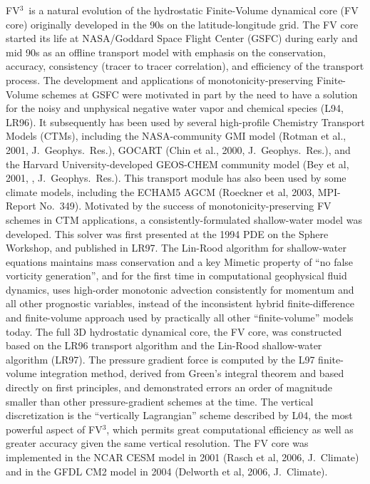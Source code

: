\documentclass[12pt,letterpaper]{book}
\newcommand{\fv}{FV$^{\mathrm{3}}$}
\begin{document}
\fv\ is a natural evolution of the hydrostatic Finite-Volume dynamical core (FV core) originally developed in the 90s on the latitude-longitude grid. The FV core started its life at NASA/Goddard Space Flight Center (GSFC) during early and mid 90s as an offline transport model with emphasis on the conservation, accuracy, consistency (tracer to tracer correlation), and efficiency of the transport process. The development and applications of monotonicity-preserving Finite-Volume schemes at GSFC were motivated in part by the need to have a solution for the noisy and unphysical negative water vapor and chemical species (L94, LR96). It subsequently has been used by several high-profile Chemistry Transport Models (CTMs), including the NASA-community GMI model (Rotman et al., 2001, J.\ Geophys.\ Res.), GOCART (Chin et al., 2000, J.\ Geophys.\ Res.), and the Harvard University-developed GEOS-CHEM community model (Bey et al, 2001, , J.\ Geophys.\ Res.). This transport module has also been used by some climate models, including the ECHAM5 AGCM (Roeckner et al, 2003, MPI-Report No.\ 349). Motivated by the success of monotonicity-preserving FV schemes in CTM applications, a consistently-formulated shallow-water model was developed. This solver was first presented at the 1994 PDE on the Sphere Workshop, and published in LR97. The Lin-Rood algorithm for shallow-water equations maintains mass conservation and a key Mimetic property of ``no false vorticity generation'', and for the first time in computational geophysical fluid dynamics, uses high-order monotonic advection consistently for momentum and all other prognostic variables, instead of the inconsistent hybrid finite-difference and finite-volume approach used by practically all other ``finite-volume'' models today. The full 3D hydrostatic dynamical core, the FV core, was constructed based on the LR96 transport algorithm and the Lin-Rood shallow-water algorithm (LR97). The pressure gradient force is computed by the L97 finite-volume integration method, derived from Green's integral theorem and based directly on first principles, and demonstrated errors an order of magnitude smaller than other pressure-gradient schemes at the time. The vertical discretization is the ``vertically Lagrangian'' scheme described by L04, the most powerful aspect of \fv, which permits great computational efficiency as well as greater accuracy given the same vertical resolution. The FV core was implemented in the NCAR CESM model in 2001 (Rasch et al, 2006, J.\ Climate) and in the GFDL CM2 model in 2004 (Delworth et al, 2006, J.\ Climate). 
\end{document}
